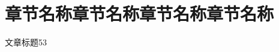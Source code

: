 \documentclass[color=orange,openany]{textbook-cn}
\begin{document}
\begin{Appendix}
\Remark{\lipsum[2]}





\begin{Block*}[测试标题]
\lipsum\lipsum
\end{Block*}


\chapter*{章节名称章节名称章节名称章节名称}
\lipsum
\lipsum




\newcommand{\wx}{\underline{~~\thewxcounter\refstepcounter{wxcounter}~~}}

\begin{Reading}{文章标题}{5}{3}
\lipsum[2]
\end{Reading}



\end{Appendix}
\end{document}
